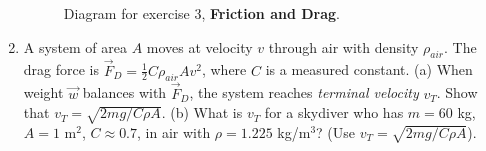 \documentclass[10pt]{article}
\begin{document}
\begin{enumerate}
\begin{figure}[hb]
\caption{\label{fig:blocks} Diagram for exercise 3, \textbf{Friction and Drag}.}
\end{figure}
\item A system of area $A$ moves at velocity $v$ through air with density $\rho_{air}$.  The drag force is $\vec{F}_D = \frac{1}{2}C\rho_{air} A v^2$, where $C$ is a measured constant.  (a) When weight $\vec{w}$ balances with $\vec{F}_D$, the system reaches \textit{terminal velocity} $v_{T}$.  Show that $v_T = \sqrt{2mg/C\rho A}$.  (b) What is $v_{T}$ for a skydiver who has $m=60$ kg, $A=1$ m$^2$, $C \approx 0.7$, in air with $\rho=1.225$ kg/m$^3$? (Use $v_T = \sqrt{2mg/C\rho A}$).
\end{enumerate}
\end{document}

